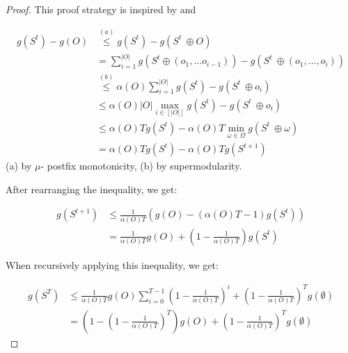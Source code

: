\documentclass{article}
\begin{document}
\begin{proof}

This proof strategy is inspired by \citet{streeter2008online} and \citet{liberty2017greedy}

\begin{align*}
    g(S^t) -g(O) &\overset{(a)}{\leq} g(S^t) - g(S^t\ \oplus O) \\
    &=\sum_{i = 1}^{|O|} g(S^t \oplus \left(o_1, \dots o_{i - 1}\right)) -g(S^t\ \oplus \left(o_1, \dots, o_{i}\right))\\
    &\overset{(b)}{\leq}  \alpha(O)\sum_{i = 1}^{|O|} g(S^t) -g(S^t\ \oplus  o_{i}) \\
    &\leq \alpha(O)|O|\max_{i \in [|O|]} g(S^t) -g(S^t\ \oplus  o_{i}) \\
    &\leq \alpha(O) T g(S^t) -  \alpha(O) T\min_{\omega \in \Omega} g(S^t\ \oplus  \omega) \\
    &= \alpha(O) Tg(S^t) -  \alpha(O) Tg(S^{t + 1})
\end{align*}
(a) by $\mu$- postfix monotonicity, (b) by supermodularity. 

After rearranging the inequality, we get:

\begin{align*}
    g(S^{t + 1}) &\leq \frac{1}{\alpha(O) T}\left(g(O) -  \left(\alpha(O) T - 1\right)g(S^t)\right) \\
    &= \frac{1}{\alpha(O) T}g(O) + \left(1 - \frac{1}{\alpha(O) T}\right)g(S^t)
\end{align*}

When recursively applying this inequality, we get:

\begin{align*}
     g(S^{T}) &\leq \frac{1}{\alpha(O) T}g(O)\sum_{i = 0}^{T - 1}\left(1 - \frac{1}{\alpha(O) T}\right)^i + \left(1 - \frac{1}{\alpha(O) T}\right)^Tg(\emptyset) \\
     &= \left(1 - \left(1 - \frac{1}{\alpha(O) T}\right)^T\right)g(O) + \left(1 - \frac{1}{\alpha(O) T}\right)^Tg(\emptyset)
\end{align*}


\end{proof}
\end{document}

